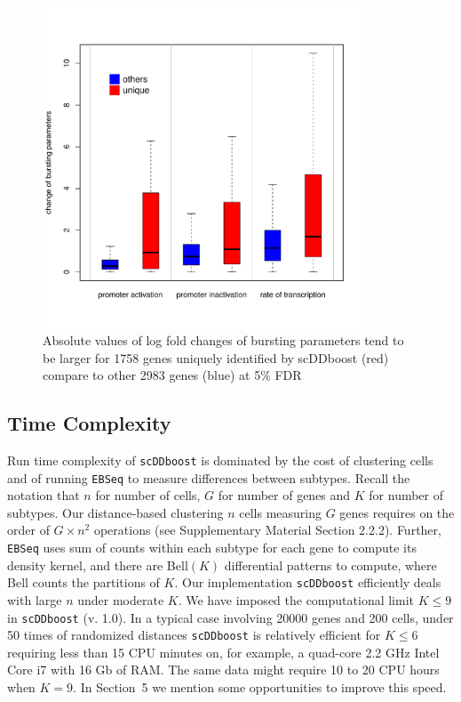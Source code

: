 \documentclass[aoas,preprint]{imsart}
\begin{document}
\begin{figure}[H]
\includegraphics[width = 0.85\textwidth]{Figs/D3E_box.pdf}
\caption{ Absolute values of log fold changes of bursting parameters tend to be larger for 1758 genes uniquely identified by scDDboost (red) compare to other 2983 genes (blue) at 5\% FDR}
 \label{fig:bursting}
\end{figure}


\subsection{Time Complexity}

Run time complexity of \texttt{scDDboost} is dominated by the cost of clustering cells and of running \texttt{EBSeq} to measure differences between subtypes. 
Recall the notation that $n$ for number of cells, $G$ for number of genes and $K$ for number of subtypes. 
Our distance-based clustering  $n$ cells measuring $G$ genes requires on the order of $G \times n^2$ operations (see Supplementary Material Section 2.2.2).
Further, \texttt{EBSeq} uses sum of counts within each subtype for each gene to compute its density kernel, and there are Bell$(K)$ differential patterns to compute,
where Bell counts the partitions of $K$.  
Our implementation \texttt{scDDboost} efficiently deals with large $n$ under moderate $K$.  We have imposed the computational limit  $K \leq 9$ in
 \verb+scDDboost+ (v. 1.0).  In a typical case involving 20000 genes and 200 cells,
 under 50 times of randomized distances \verb+scDDboost+  is relatively efficient for $K \leq 6$ requiring
 less than 15 CPU minutes on, for example, a quad-core 2.2 GHz Intel Core i7 with 16 Gb of RAM.
 The same data might require 10 to 20 CPU hours when $K=9$.  In Section~5 we mention some opportunities to improve this speed.
\end{document}
